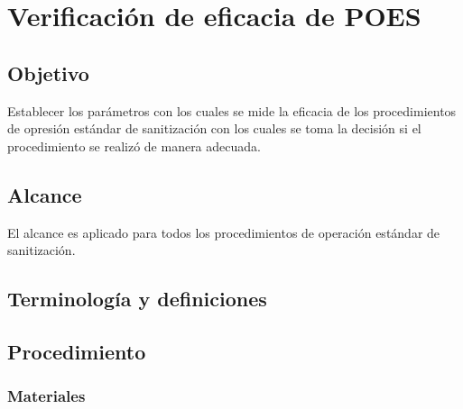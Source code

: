 \renewcommand{\MenorVer}{0}
\renewcommand{\MayorVer}{2}
\renewcommand{\Codigo}{HYS-19-IT}
\renewcommand{\FechaPub}{2023--01}
\renewcommand{\Titulo}{Verificación de eficacia de POES}

\section{\Titulo}

\subsection{Objetivo}

Establecer los parámetros con los cuales se mide la eficacia de los procedimientos de opresión estándar de sanitización con los cuales se toma la decisión si el procedimiento se realizó de manera adecuada.

\subsection{Alcance}

El alcance es aplicado para todos los procedimientos de operación estándar de sanitización.

\subsection{Terminología y definiciones}

\begin{description}
\end{description}



\subsection{Procedimiento}

\subsubsection{Materiales}

